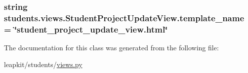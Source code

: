 \hypertarget{classstudents_1_1views_1_1_student_project_update_view_a7f1c65fd35f5879a287cf60e771c5264}{
\subsubsection[{template\-\_\-name}]{\setlength{\rightskip}{0pt plus 5cm}string students.\-views.\-Student\-Project\-Update\-View.\-template\-\_\-name = \char`\"{}student\-\_\-project\-\_\-update\-\_\-view.\-html\char`\"{}\hspace{0.3cm}{\ttfamily [static]}}}\label{classstudents_1_1views_1_1_student_project_update_view_a7f1c65fd35f5879a287cf60e771c5264}


The documentation for this class was generated from the following file\-:\begin{DoxyCompactItemize}
\item 
leapkit/students/\hyperlink{views_8py}{views.\-py}\end{DoxyCompactItemize}
